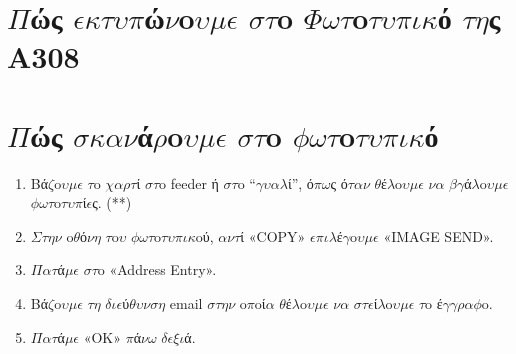 \documentclass[a4paper,11pt,english]{sphinxmanual}
\begin{document}
\section{\(\Pi\)ώς \(\epsilon\)\(\kappa\)\(\tau\)\(\upsilon\)\(\pi\)ώ\(\nu\)o\(\upsilon\)\(\mu\)\(\epsilon\) \(\sigma\)\(\tau\)o \(\Phi\)\(\omega\)\(\tau\)o\(\tau\)\(\upsilon\)\(\pi\)\(\iota\)\(\kappa\)ό \(\tau\)\(\eta\)ς A308}
\label{\detokenize{HowToPrint::doc}}\label{\detokenize{HowToPrint:id1}}

\section{\(\Pi\)ώς \(\sigma\)\(\kappa\)\(\alpha\)\(\nu\)ά\(\rho\)o\(\upsilon\)\(\mu\)\(\epsilon\) \(\sigma\)\(\tau\)o \(\phi\)\(\omega\)\(\tau\)o\(\tau\)\(\upsilon\)\(\pi\)\(\iota\)\(\kappa\)ό}
\label{\detokenize{HowToScan::doc}}\label{\detokenize{HowToScan:id1}}\begin{enumerate}
\item {} 
Bά\(\zeta\)o\(\upsilon\)\(\mu\)\(\epsilon\) \(\tau\)o \(\chi\)\(\alpha\)\(\rho\)\(\tau\)ί \(\sigma\)\(\tau\)o feeder ή \(\sigma\)\(\tau\)o “\(\gamma\)\(\upsilon\)\(\alpha\)\(\lambda\)ί”, ό\(\pi\)\(\omega\)ς ό\(\tau\)\(\alpha\)\(\nu\) \(\theta\)έ\(\lambda\)o\(\upsilon\)\(\mu\)\(\epsilon\) \(\nu\)\(\alpha\) \(\beta\)\(\gamma\)ά\(\lambda\)o\(\upsilon\)\(\mu\)\(\epsilon\) \(\phi\)\(\omega\)\(\tau\)o\(\tau\)\(\upsilon\)\(\pi\)ί\(\epsilon\)ς. (**)

\item {} 
\(\Sigma\)\(\tau\)\(\eta\)\(\nu\) o\(\theta\)ό\(\nu\)\(\eta\) \(\tau\)o\(\upsilon\) \(\phi\)\(\omega\)\(\tau\)o\(\tau\)\(\upsilon\)\(\pi\)\(\iota\)\(\kappa\)oύ, \(\alpha\)\(\nu\)\(\tau\)ί «COPY» \(\epsilon\)\(\pi\)\(\iota\)\(\lambda\)έ\(\gamma\)o\(\upsilon\)\(\mu\)\(\epsilon\) «IMAGE SEND».

\item {} 
\(\Pi\)\(\alpha\)\(\tau\)ά\(\mu\)\(\epsilon\) \(\sigma\)\(\tau\)o «Address Entry».

\item {} 
Bά\(\zeta\)o\(\upsilon\)\(\mu\)\(\epsilon\) \(\tau\)\(\eta\) \(\delta\)\(\iota\)\(\epsilon\)ύ\(\theta\)\(\upsilon\)\(\nu\)\(\sigma\)\(\eta\) email \(\sigma\)\(\tau\)\(\eta\)\(\nu\) o\(\pi\)oί\(\alpha\) \(\theta\)έ\(\lambda\)o\(\upsilon\)\(\mu\)\(\epsilon\) \(\nu\)\(\alpha\) \(\sigma\)\(\tau\)\(\epsilon\)ί\(\lambda\)o\(\upsilon\)\(\mu\)\(\epsilon\) \(\tau\)o έ\(\gamma\)\(\gamma\)\(\rho\)\(\alpha\)\(\phi\)o.

\item {} 
\(\Pi\)\(\alpha\)\(\tau\)ά\(\mu\)\(\epsilon\) «OK» \(\pi\)ά\(\nu\)\(\omega\) \(\delta\)\(\epsilon\)\(\xi\)\(\iota\)ά.


\end{enumerate}
\end{document}

